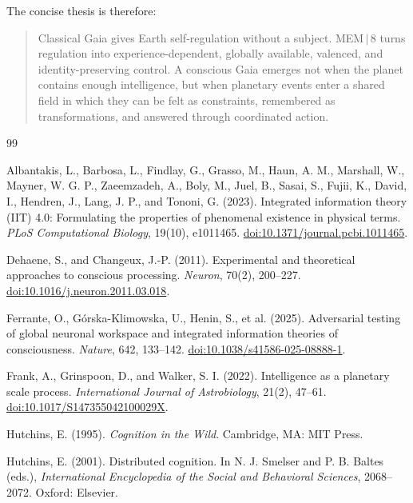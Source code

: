 \documentclass[11pt]{article}
\begin{document}
The concise thesis is therefore:

\begin{quote}
Classical Gaia gives Earth self-regulation without a subject. MEM\,$|$\,8 turns regulation into experience-dependent, globally available, valenced, and identity-preserving control. A conscious Gaia emerges not when the planet contains enough intelligence, but when planetary events enter a shared field in which they can be felt as constraints, remembered as transformations, and answered through coordinated action.
\end{quote}

\begin{thebibliography}{99}

Albantakis, L., Barbosa, L., Findlay, G., Grasso, M., Haun, A. M., Marshall, W., Mayner, W. G. P., Zaeemzadeh, A., Boly, M., Juel, B., Sasai, S., Fujii, K., David, I., Hendren, J., Lang, J. P., and Tononi, G. (2023). Integrated information theory (IIT) 4.0: Formulating the properties of phenomenal existence in physical terms. \emph{PLoS Computational Biology}, 19(10), e1011465. \href{https://doi.org/10.1371/journal.pcbi.1011465}{doi:10.1371/journal.pcbi.1011465}.

Dehaene, S., and Changeux, J.-P. (2011). Experimental and theoretical approaches to conscious processing. \emph{Neuron}, 70(2), 200--227. \href{https://doi.org/10.1016/j.neuron.2011.03.018}{doi:10.1016/j.neuron.2011.03.018}.

Ferrante, O., Górska-Klimowska, U., Henin, S., et al. (2025). Adversarial testing of global neuronal workspace and integrated information theories of consciousness. \emph{Nature}, 642, 133--142. \href{https://doi.org/10.1038/s41586-025-08888-1}{doi:10.1038/s41586-025-08888-1}.

Frank, A., Grinspoon, D., and Walker, S. I. (2022). Intelligence as a planetary scale process. \emph{International Journal of Astrobiology}, 21(2), 47--61. \href{https://doi.org/10.1017/S147355042100029X}{doi:10.1017/S147355042100029X}.

Hutchins, E. (1995). \emph{Cognition in the Wild}. Cambridge, MA: MIT Press.

Hutchins, E. (2001). Distributed cognition. In N. J. Smelser and P. B. Baltes (eds.), \emph{International Encyclopedia of the Social and Behavioral Sciences}, 2068--2072. Oxford: Elsevier.


\end{thebibliography}
\end{document}
